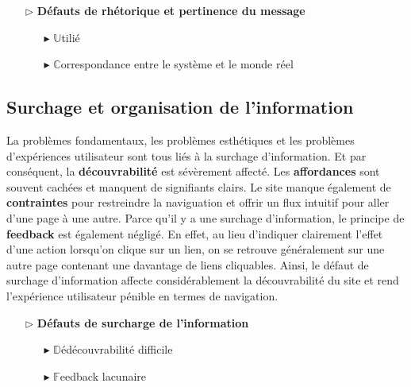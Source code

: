 \documentclass[9pt]{report}
\begin{document}
\begin{multicols*}{2}
  \begin{itemize}
    \item [$\rhd$ ] \textbf{Défauts de rhétorique et pertinence du message}  
      \begin{itemize}
        \item [$\blacktriangleright$ ] $\mathbb{U}$tilié
        \item [$\blacktriangleright$ ] $\mathbb{C}$orrespondance entre le système et le monde réel
      \end{itemize}
  \end{itemize}

  \subsection{Surchage et organisation de l'information} 
  La problèmes fondamentaux, les problèmes esthétiques et 
  les problèmes d'expériences utilisateur sont tous 
  liés à la surchage d'information.  Et par conséquent, la 
  \textbf{découvrabilité} est sévèrement affecté. 
  Les \textbf{affordances} sont souvent cachées et manquent 
  de signifiants clairs. Le site manque également de 
  \textbf{contraintes} pour restreindre la naviguation et 
  offrir un flux intuitif pour aller d'une page à une autre. Parce qu'il 
  y a une surchage d'information, le principe de \textbf{feedback} est 
  également négligé. En effet, au lieu d'indiquer clairement 
  l'effet d'une action lorsqu'on clique sur un lien, on 
  se retrouve généralement sur une autre page contenant 
  une davantage de liens cliquables. Ainsi, le défaut de surchage 
  d'information affecte considérablement la découvrabilité 
  du site et rend l'expérience utilisateur pénible en termes de 
  navigation. 


  \begin{itemize}
    \item [$\rhd$ ] \textbf{Défauts de surcharge de l'information}  
      \begin{itemize}
        \item [$\blacktriangleright$ ] $\mathbb{D}$édécouvrabilité difficile
        \item [$\blacktriangleright$ ] $\mathbb{F}$eedback lacunaire
      \end{itemize}
  \end{itemize}




  







  \vspace{-1em}
\end{multicols*}
\end{document}
